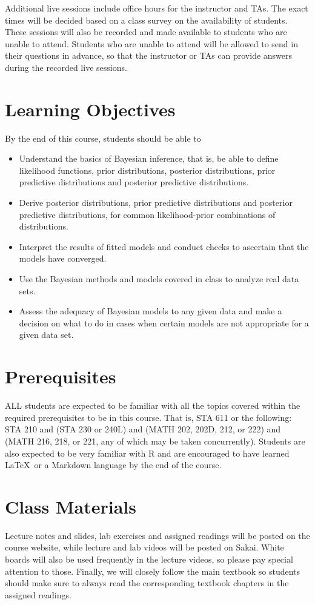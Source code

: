 \documentclass[11pt, a4paper]{article}
\begin{document}
Additional live sessions include office hours for the instructor and TAs. The exact times will be decided based on a class survey on the availability of students. These sessions will also be recorded and made available to students who are unable to attend. Students who are unable to attend will be allowed to send in their questions in advance, so that the instructor or TAs can provide answers during the recorded live sessions.

\section{Learning Objectives}
By the end of this course, students should be able to
\begin{itemize}[label= {\color{darkblue}{\ArrowBoldRightStrobe}}]
	\item Understand the basics of Bayesian inference, that is, be able to define likelihood functions, prior distributions, posterior distributions, prior predictive distributions and posterior predictive distributions.
	\item Derive posterior distributions, prior predictive distributions and posterior predictive distributions, for common likelihood-prior combinations of distributions.
	\item Interpret the results of fitted models and conduct checks to ascertain that the models have converged.
	\item Use the Bayesian methods and models covered in class to analyze real data sets.
	\item Assess the adequacy of Bayesian models to any given data and make a decision on what to do in cases when certain models are not appropriate for a given data set.
\end{itemize}


\section{Prerequisites}
ALL students are expected to be familiar with all the topics covered within the required prerequisites to be in this course. That is, STA 611 or the following: STA 210 and (STA 230 or 240L) and (MATH 202, 202D, 212, or 222) and (MATH 216, 218, or 221, any of which may be taken concurrently). Students are also expected to be very familiar with \textsf{R} and are encouraged to have learned \LaTeX \ or a Markdown language by the end of the course.


\section{Class Materials}
Lecture notes and slides, lab exercises and assigned readings will be posted on the course website, while lecture and lab videos will be posted on Sakai. White boards will also be used frequently in the lecture videos, so please pay special attention to those. Finally, we will closely follow the main textbook so students should make sure to always read the corresponding textbook chapters in the assigned readings.
\end{document}
